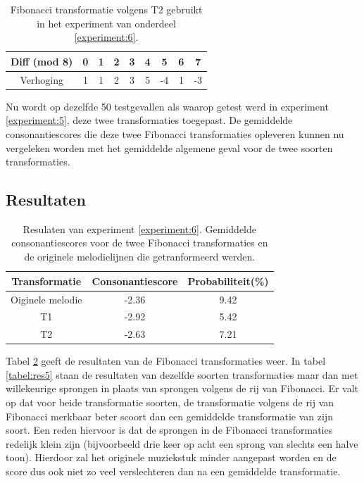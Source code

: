 \begin{table}
  \centering
  \begin{tabular}{c | c c c c c c c c }
    Diff (mod 8) & 0 & 1 & 2 & 3 & 4 & 5 & 6 & 7 \\
    \hline
    \hline
    Verhoging & 1 & 1 & 2 & 3 & 5 & -4 & 1 & -3 \\
  \end{tabular}
  \caption{Fibonacci transformatie volgens T2 gebruikt in het experiment van onderdeel \ref{experiment:6}.}
  \label{tabel:exp6:T2}
\end{table}

Nu wordt op dezelfde 50 testgevallen als waarop getest werd in experiment \ref{experiment:5}, deze twee transformaties toegepast. De gemiddelde consonantiescores die deze twee Fibonacci transformaties opleveren kunnen nu vergeleken worden met het gemiddelde algemene geval voor de twee soorten transformaties. 

\subsection{Resultaten}

\begin{table}
  \centering
  \begin{tabular}{c | c c }    
    Transformatie & Consonantiescore & Probabiliteit(\%)\\
    \hline
    Oiginele melodie & -2.36 & 9.42\\
    T1 & -2.92 & 5.42\\
    T2 & -2.63 & 7.21\\
  \end{tabular}
  \caption{Resulaten van experiment \ref{experiment:6}. Gemiddelde consonantiescores voor de twee Fibonacci transformaties en de originele melodielijnen die getranformeerd werden.}
  \label{tabel:res6}
\end{table}

Tabel \ref{tabel:res6} geeft de resultaten van de Fibonacci transformaties weer. In tabel \ref{tabel:res5} staan de resultaten van dezelfde soorten transformaties maar dan met willekeurige sprongen in plaats van sprongen volgens de rij van Fibonacci. Er valt op dat voor beide transformatie soorten, de transformatie volgens de rij van Fibonacci merkbaar beter scoort dan een gemiddelde transformatie van zijn soort. Een reden hiervoor is dat de sprongen in de Fibonacci transformaties redelijk klein zijn (bijvoorbeeld drie keer op acht een sprong van slechts een halve toon). Hierdoor zal het originele muziekstuk minder aangepast worden en de score dus ook niet zo veel verslechteren dan na een gemiddelde transformatie. 

